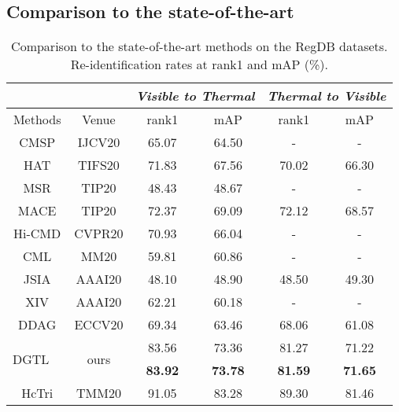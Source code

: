 \documentclass[journal]{IEEEtran}
\begin{document}
\subsection{Comparison to the state-of-the-art}

\begin{table}
\caption{Comparison to the state-of-the-art methods on the RegDB datasets. Re-identification rates at rank1 and mAP (\%).}
\label{tab:sota_regdb}
  \centering
  \begin{tabular}{lc|c|c|c||c|c}
    \toprule[2pt]
    \multicolumn{3}{c|}{}  & \multicolumn{2}{c||}{\emph{Visible to Thermal}} & \multicolumn{2}{c}{\emph{Thermal to Visible}} \\ \hline
      \multicolumn{2}{c|}{Methods} & Venue &   rank1   & mAP   &  rank1  & mAP      \\ \toprule[1pt]
      \multicolumn{2}{c|}{CMSP \cite{wu2020rgb}} & IJCV20 & 65.07   & 64.50  & -   & -  \\
      \multicolumn{2}{c|}{HAT \cite{ye2020vipr}} & TIFS20 & 71.83  & 67.56 & 70.02  & 66.30  \\
      \multicolumn{2}{c|}{MSR \cite{Feng2020LearningMR}} & TIP20 & 48.43  & 48.67  & -  & -  \\
      \multicolumn{2}{c|}{MACE \cite{Ye2020CrossModalityPR}} & TIP20 & 72.37 & 69.09 & 72.12 & 68.57 \\
      \multicolumn{2}{c|}{Hi-CMD \cite{choi2020hi}} & CVPR20 & 70.93  & 66.04   &  - & -   \\
      \multicolumn{2}{c|}{CML \cite{Ling2020ClassAwareMM}} & MM20 & 59.81 & 60.86  &  - & -   \\
      \multicolumn{2}{c|}{JSIA \cite{Wang2020CrossModalityPG}} & AAAI20 & 48.10  & 48.90 & 48.50  & 49.30 \\
      \multicolumn{2}{c|}{XIV \cite{Li2020InfraredVisibleCP}} & AAAI20 & 62.21  & 60.18  &  - & -   \\
\multicolumn{2}{c|}{DDAG \cite{ye2020dynamic}} & ECCV20 & 69.34  & 63.46 & 68.06  & 61.08 \\  \hline
      \multirow{2}{*}{DGTL} & & \multirow{2}{*}{ours} & 83.56 & 73.36 & 81.27 & 71.22 \\
                            & & & \textbf{83.92} & \textbf{73.78} & \textbf{81.59} & \textbf{71.65} \\ \hline \hline
      \multicolumn{2}{c|}{HcTri \cite{Liu2020ParametersSE}} & TMM20 & 91.05 & 83.28 & 89.30 & 81.46 \\
      \toprule[2pt]
  \end{tabular}
\end{table}
\end{document}
